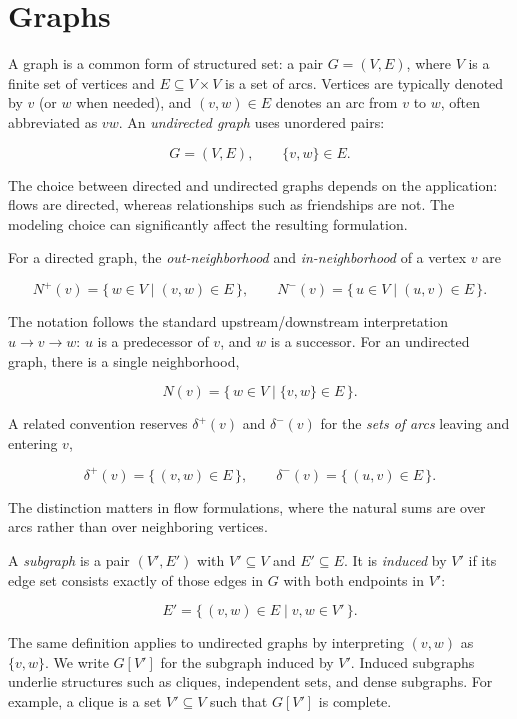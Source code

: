 \section{Graphs}\label{sec:2.3}

A graph is a common form of structured set: a pair \(G = (V, E)\), where
\(V\) is a finite set of vertices and \(E \subseteq V \times V\) is a
set of arcs. Vertices are typically denoted by \(v\) (or \(w\) when
needed), and \((v, w) \in E\) denotes an arc from \(v\) to \(w\), often
abbreviated as \(vw\). An \emph{undirected graph} uses unordered pairs:

\[
G = (V, E), \qquad \{v, w\} \in E.
\]

The choice between directed and undirected graphs depends on the
application: flows are directed, whereas relationships such as
friendships are not. The modeling choice can significantly affect the
resulting formulation.

For a directed graph, the \emph{out-neighborhood} and
\emph{in-neighborhood} of a vertex \(v\) are

\[
N^+(v) = \{\, w \in V \mid (v, w) \in E \,\}, \qquad N^-(v) = \{\, u \in V \mid (u, v) \in E \,\}.
\]

The notation follows the standard upstream/downstream interpretation
\(u \to v \to w\): \(u\) is a predecessor of \(v\), and \(w\) is a
successor. For an undirected graph, there is a single neighborhood,

\[
N(v) = \{\, w \in V \mid \{v, w\} \in E \,\}.
\]

A related convention reserves \(\delta^+(v)\) and \(\delta^-(v)\) for
the \emph{sets of arcs} leaving and entering \(v\),

\[
\delta^+(v) = \{\, (v, w) \in E \,\}, \qquad \delta^-(v) = \{\, (u, v) \in E \,\}.
\]

The distinction matters in flow formulations, where the natural sums are
over arcs rather than over neighboring vertices.

A \emph{subgraph} is a pair \((V', E')\) with \(V' \subseteq V\) and
\(E' \subseteq E\). It is \emph{induced} by \(V'\) if its edge set
consists exactly of those edges in \(G\) with both endpoints in \(V'\):

\[
E' = \{\, (v, w) \in E \mid v, w \in V' \,\}.
\]

The same definition applies to undirected graphs by interpreting
\((v, w)\) as \(\{v, w\}\). We write \(G[V']\) for the subgraph induced
by \(V'\). Induced subgraphs underlie structures such as cliques,
independent sets, and dense subgraphs. For example, a clique is a set
\(V' \subseteq V\) such that \(G[V']\) is complete.


